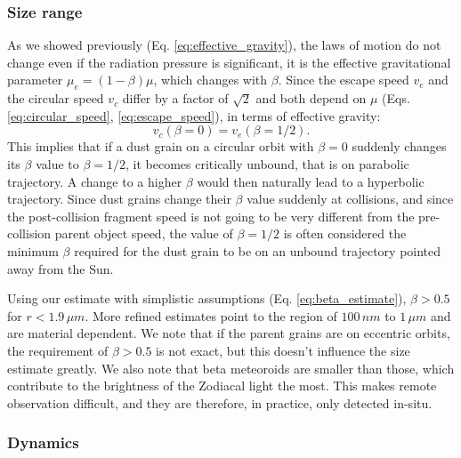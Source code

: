 \subsubsection{Size range}

As we showed previously (Eq. \ref{eq:effective_gravity}), the laws of motion do not change even if the radiation pressure is significant, it is the effective gravitational parameter $\mu_{e} = (1-\beta) \mu$, which changes with $\beta$. Since the escape speed $v_e$ and the circular speed $v_c$ differ by a factor of $\sqrt{2}$ and both depend on $\mu$ (Eqs. \ref{eq:circular_speed}, \ref{eq:escape_speed}), in terms of effective gravity:
\begin{equation}
    v_c(\beta=0) = v_e(\beta=1/2).
\end{equation}
This implies that if a dust grain on a circular orbit with $\beta=0$ suddenly changes its $\beta$ value to $\beta = 1/2$, it becomes critically unbound, that is on parabolic trajectory. A change to a higher $\beta$ would then naturally lead to a hyperbolic trajectory. Since dust grains change their $\beta$ value suddenly at collisions, and since the post-collision fragment speed is not going to be very different from the pre-collision parent object speed, the value of $\beta=1/2$ is often considered the minimum $\beta$ required for the dust grain to be on an unbound trajectory pointed away from the Sun.

Using our estimate with simplistic assumptions (Eq. \ref{eq:beta_estimate}), $\beta > 0.5$ for $r < 1.9 \, \si{\mu m}$. More refined estimates \citep{kimura2003composition} point to the region of $100 \, \si{nm}$ to $1 \, \si{\mu m}$ and are material dependent. We note that if the parent grains are on eccentric orbits, the requirement of $\beta > 0.5$ is not exact, but this doesn't influence the size estimate greatly. We also note that beta meteoroids are smaller than those, which contribute to the brightness of the Zodiacal light the most. This makes remote observation difficult, and they are therefore, in practice, only detected in-situ.

\subsubsection{Dynamics}

